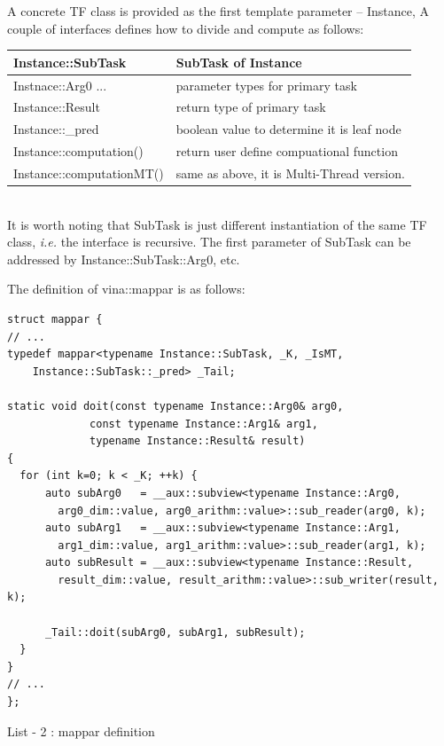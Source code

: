 \documentclass[a4paper, 11pt]{article}
\begin{document}
A concrete TF class is provided as the first template parameter -- Instance, A couple of interfaces defines how to divide and compute as follows:
\begin{tabular}{|l|l|}
\hline
Instance::SubTask  &         SubTask of Instance \\
\hline
Instnace::Arg0 ... &         parameter types for primary task\\
\hline
Instance::Result   &         return type of primary task\\
\hline
Instance::\_pred    &         boolean value to determine it is leaf node\\
\hline
Instance::computation() &     return user define compuational function\\
\hline
Instance::computationMT() &    same as above, it is Multi-Thread version.\\
\hline
\end{tabular}
\\

It is worth noting that SubTask is just different instantiation of the same TF class, \textit{i.e.} the interface is recursive. The first parameter of SubTask can be addressed by Instance::SubTask::Arg0, etc.

The definition of vina::mappar is as follows:\\

\makebox[\textwidth]{\hrulefill}
\begin{verbatim}
struct mappar {
// ...
typedef mappar<typename Instance::SubTask, _K, _IsMT, 
	Instance::SubTask::_pred> _Tail;

static void doit(const typename Instance::Arg0& arg0, 
		     const typename Instance::Arg1& arg1, 
		     typename Instance::Result& result)
{
  for (int k=0; k < _K; ++k) {
      auto subArg0   = __aux::subview<typename Instance::Arg0, 
        arg0_dim::value, arg0_arithm::value>::sub_reader(arg0, k);
      auto subArg1   = __aux::subview<typename Instance::Arg1, 
        arg1_dim::value, arg1_arithm::value>::sub_reader(arg1, k);
      auto subResult = __aux::subview<typename Instance::Result, 
        result_dim::value, result_arithm::value>::sub_writer(result, k);

      _Tail::doit(subArg0, subArg1, subResult);
  }
}
// ...
};
\end{verbatim}
\makebox[\textwidth]{\hrulefill}
\begin{center}
List - 2 : mappar definition
\label{mappar-def}
\end{center}
\end{document}

